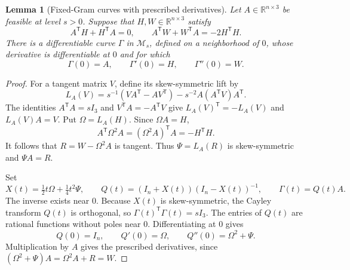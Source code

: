 \documentclass[11pt]{article}
\numberwithin{equation}{section}
\newtheorem{lemma}[lemma]{Lemma}
\theoremstyle{definition}
\theoremstyle{definition}
\newcommand{\R}{\mathbb R}
\begin{document}
\begin{lemma}[Fixed-Gram curves with prescribed derivatives]
\label{lem:fixed-gram-jets}
Let $A\in\R^{n\times3}$ be feasible at level $s>0$. Suppose that
$H,W\in\R^{n\times3}$ satisfy
\[
 A^{\mathsf T}H+H^{\mathsf T}A=0,\qquad
 A^{\mathsf T}W+W^{\mathsf T}A=-2H^{\mathsf T}H.
\]
There is a differentiable curve $\Gamma$ in $\mathcal M_s$, defined on
a neighborhood of $0$, whose derivative is differentiable at $0$ and
for which
\[
 \Gamma(0)=A,\qquad \Gamma'(0)=H,\qquad \Gamma''(0)=W.
\]
\end{lemma}
\begin{proof}
For a tangent matrix $V$, define its skew-symmetric lift by
\[
 L_A(V)=s^{-1}(VA^{\mathsf T}-AV^{\mathsf T})
       -s^{-2}A(A^{\mathsf T}V)A^{\mathsf T}.
\]
The identities $A^{\mathsf T}A=sI_3$ and
$V^{\mathsf T}A=-A^{\mathsf T}V$ give
$L_A(V)^{\mathsf T}=-L_A(V)$ and $L_A(V)A=V$.
Put $\Omega=L_A(H)$. Since $\Omega A=H$,
\[
 A^{\mathsf T}\Omega^2A
 = (\Omega^2A)^{\mathsf T}A=-H^{\mathsf T}H.
\]
It follows that $R=W-\Omega^2A$ is tangent. Thus
$\Psi=L_A(R)$ is skew-symmetric and $\Psi A=R$.

Set
\[
 X(t)=\tfrac12t\Omega+\tfrac14t^2\Psi,\qquad
 Q(t)=(I_n+X(t))(I_n-X(t))^{-1},\qquad
 \Gamma(t)=Q(t)A.
\]
The inverse exists near $0$. Because $X(t)$ is skew-symmetric,
the Cayley transform $Q(t)$ is orthogonal, so
$\Gamma(t)^{\mathsf T}\Gamma(t)=sI_3$.
The entries of $Q(t)$ are rational functions without poles near $0$.
Differentiating at $0$ gives
\[
 Q(0)=I_n,\qquad Q'(0)=\Omega,\qquad
 Q''(0)=\Omega^2+\Psi.
\]
Multiplication by $A$ gives the prescribed derivatives, since
$(\Omega^2+\Psi)A=\Omega^2A+R=W$.
\end{proof}
\end{document}
